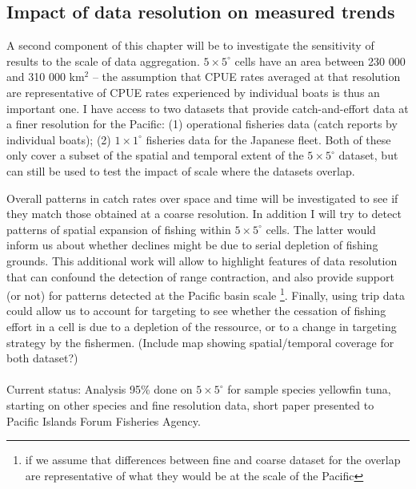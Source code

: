 \documentclass{article}
\newcommand{\griddef}[2]{$#1 \times #2^\circ$}
\begin{document}
\subsection{Impact of data resolution on measured trends}


A second component of this chapter will be to investigate the
sensitivity of results to the scale of data aggregation. \griddef{5}{5}
cells have an area between 230 000 and 310 000 km$^2$ -- the assumption
that CPUE rates averaged at that resolution are representative of
CPUE rates experienced by individual boats is thus an important one. I
have access to two datasets that provide catch-and-effort data at a finer
resolution for the Pacific: (1) operational fisheries data (catch reports by
individual boats); (2) \griddef{1}{1} fisheries data for the Japanese
fleet. Both of these only cover a subset of the spatial and temporal
extent of the \griddef{5}{5} dataset, but can still be used to test
the impact of scale where the datasets overlap.

Overall patterns in catch rates over space and time will be investigated to
see if they match those obtained at a coarse resolution. In addition I
will try to detect patterns of spatial expansion of fishing within
\griddef{5}{5} cells. The latter would inform us about whether
declines might be due to serial depletion of fishing
grounds. This additional work will allow to highlight features of data
resolution that can confound the detection of range contraction, and
also provide support (or not) for patterns detected at the Pacific
basin scale \footnote{if we assume that
differences between fine and coarse dataset for the overlap are
representative of what they would be at the scale of the
Pacific}. Finally, using trip data could allow us to account for targeting
to see whether the cessation of fishing effort in a cell is due to a depletion
of the ressource, or to a change in targeting strategy by the fishermen.
(Include map showing spatial/temporal coverage for both dataset?)\\
\\
Current status: Analysis 95\% done on \griddef{5}{5} for sample
species yellowfin tuna, starting on other species and fine resolution
data, short paper presented to Pacific Islands Forum Fisheries Agency.

\end{document}
